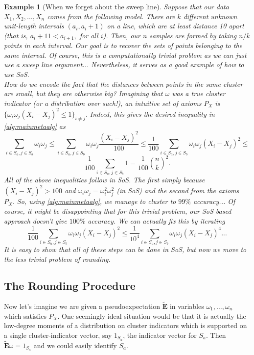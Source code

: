 \documentclass[12pt]{article}%
\newtheorem{example}[theorem]{Example}
\newcommand{\pseudoexpect}{\tilde{\mathbf{E}}}
\begin{document}
\begin{example}[When we forget about the sweep line]
\normalfont
Suppose that our data $X_1,X_2, \ldots, X_n$ comes from the following model. There are $k$ different unknown unit-length intervals $(a_i, a_i+1)$ on a line, which are at least distance 10 apart (that is, $a_i +11< a_{i+1},$  for all $i$). Then, our $n$ samples are formed by taking $n/k$ points in each interval. Our goal is to recover the sets of points belonging to the same interval. Of course, this is a computationally trivial problem as we can just use a sweep line argument... Nevertheless, it serves as a good example of how to use SoS.\\ 

\noindent
How do we encode the fact that the distances between points in the same cluster are small, but they are otherwise big?  Imagining that $\omega$ was a true cluster indicator (or a distribution over such!), an intuitive set of axioms $P_X$ is $\{\omega_i\omega_j(X_i - X_j)^2 \leq 1\}_{i\neq j}.$ Indeed, this gives the desired inequality in \cref{alg:mainmetaalg} as 
$$
\sum_{i \in S_a, j \in S_b} \omega_i \omega_j \le 
\sum_{i \in S_a, j \in S_b} \omega_i \omega_j \frac{(X_i - X_j)^2}{100}\le 
\frac{1}{100}\sum_{i \in S_a, j \in S_b} \omega_i \omega_j {(X_i - X_j)^2} \le 
$$
$$
\frac{1}{100}\sum_{i \in S_a, j \in S_b} 1 = 
\frac{1}{100}\left(\frac{n}{k}\right)^2.
$$
All of the above inequalities follow in SoS. The first simply because $(X_i - X_j)^2>100$ and $\omega_i \omega_j  = \omega_i^2 \omega_j^2$ (in SoS) and the second from the axioms $P_X.$ So, using \cref{alg:mainmetaalg}, we manage to cluster to $99\%$ accuracy... Of course, it might be disappointing that for this trivial problem, our SoS based approach doesn't give $100\%$ accuracy. We can actually fix this by iterating
$$
\frac{1}{100}\sum_{i \in S_a, j \in S_b} \omega_i \omega_j {(X_i - X_j)^2} \le 
\frac{1}{10^4}\sum_{i \in S_a, j \in S_b} \omega_i \omega_j {(X_i - X_j)^4} ...
$$
It is easy to show that all of these steps can be done in SoS, but now we move to the less trivial problem of rounding.
\end{example}

\subsection{The Rounding Procedure}
Now let's imagine we are given a pseudoexpectation $\pseudoexpect$ in variables $\omega_1,\ldots,\omega_n$ which satisfies $P_X$.
One seemingly-ideal situation would be that it is actually the low-degree moments of a distribution on cluster indicators which is supported on a single cluster-indicator vector, say $1_{S_a}$, the indicator vector for $S_a$.
Then $\pseudoexpect \omega = 1_{S_a}$ and we could easily identify $S_a$.
\end{document}
